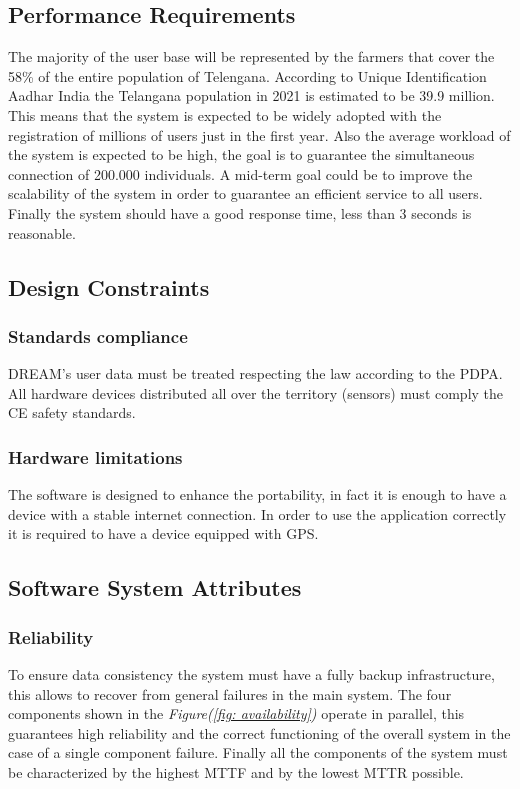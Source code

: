 \documentclass[table, 12pt]{article}
\begin{document}
\subsection{Performance Requirements}
The majority of the user base will be represented by the farmers that cover the 58\% of the entire population of Telengana.
According to Unique Identification Aadhar India the Telangana population in 2021 is estimated to be 39.9 million.
This means that the system is expected to be widely adopted with the registration of millions of users just in the first year.
Also the average workload of the system is expected to be high, the goal is to guarantee the simultaneous connection of 200.000 individuals.
A mid-term goal could be to improve the scalability of the system in order to guarantee an efficient service to all users.
Finally the system should have a good response time, less than 3 seconds is reasonable.
\subsection{Design Constraints}

\subsubsection{Standards compliance}
DREAM's user data must be treated respecting the law according to the PDPA.
All hardware devices distributed all over the territory (sensors) must comply the CE safety standards.
\subsubsection{Hardware limitations}
The software is designed to enhance the portability, in fact it is enough to have a device with a stable internet connection.
In order to use the application correctly it is required to have a device equipped with GPS.

\subsection{Software System Attributes}
\subsubsection{Reliability}
To ensure data consistency the system must have a fully backup infrastructure, this allows to recover from general failures in the main system.
The four components shown in the \textit{Figure(\ref{fig: availability})} operate in parallel, this guarantees high reliability and the correct functioning of the overall system in the case of a single component failure.
Finally all the components of the system must be characterized by the highest MTTF and by the lowest MTTR possible.
\end{document}
